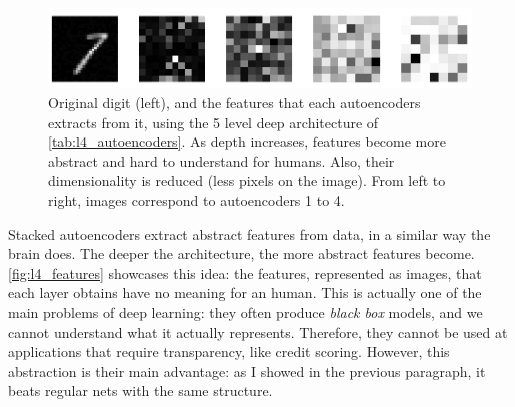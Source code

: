\documentclass[a4paper, 10pt]{article}
\begin{document}
  \begin{figure}[htpb]
    \centering
    \includegraphics[width=\linewidth]{lab4/layer_features.png}
    \caption{Original digit (left), and the features that each autoencoders 
      extracts from it, using the 5 level deep architecture of 
      \autoref{tab:l4_autoencoders}. As depth increases,
      features become more abstract and hard to understand for humans. Also,
      their dimensionality is reduced (less pixels on the image). From left to
      right, images correspond to autoencoders 1 to 4.}
    \label{fig:l4_features}
  \end{figure}

  Stacked autoencoders extract abstract features from data, in a similar way
  the brain does. The deeper the architecture, the more abstract features become.
  \autoref{fig:l4_features} showcases this idea: the features, represented as 
  images, that each layer obtains have no meaning for an human. This is actually
  one of the main problems of deep learning: they often produce \emph{black box}
  models, and we cannot understand what it actually represents. Therefore, they
  cannot be used at applications that require transparency, like credit scoring.
  However, this abstraction is their main advantage: as I showed in the previous
  paragraph, it beats regular nets with the same structure. 
\end{document}
